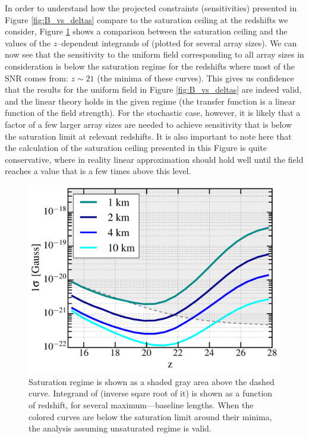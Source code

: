 In order to understand how the projected constraints (sensitivities) presented in Figure \ref{fig:B_vs_deltas} compare to the saturation ceiling at the redshifts we consider, Figure \ref{fig:Bsat} shows a comparison between the saturation ceiling and the values of the $z$--dependent integrands of \eq{\ref{eq:fisher_patch}} (plotted for several array sizes). We can now see that the sensitivity to the uniform field corresponding to all array sizes in consideration is below the saturation regime for the redshifts where most of the SNR comes from: $z\sim21$ (the minima of these curves). This gives us confidence that the results for the uniform field in Figure \ref{fig:B_vs_deltas} are indeed valid, and the linear theory holds in the given regime (the transfer function is a linear function of the field strength). For the stochastic case, however, it is likely that a factor of a few larger array sizes are needed to achieve sensitivity that is below the saturation limit at relevant redshifts. It is also important to note here that the calculation of the saturation ceiling presented in this Figure is quite conservative, where in reality linear approximation should hold well until the field reaches a value that is a few times above this level.
\begin{figure}
\centering
\includegraphics[width=.35\textwidth,keepaspectratio=true]{sigmaB0_vs_z.pdf}
\caption{Saturation regime is shown as a shaded gray area above the dashed curve. Integrand of \eq{\ref{eq:fisher_patch}} (inverse sqare root of it) is shown as a function of redshift, for several maximum---baseline lengths.  When the colored curves are below the saturation limit around their minima, the analysis assuming unsaturated regime is valid.\label{fig:Bsat}}
\end{figure}
